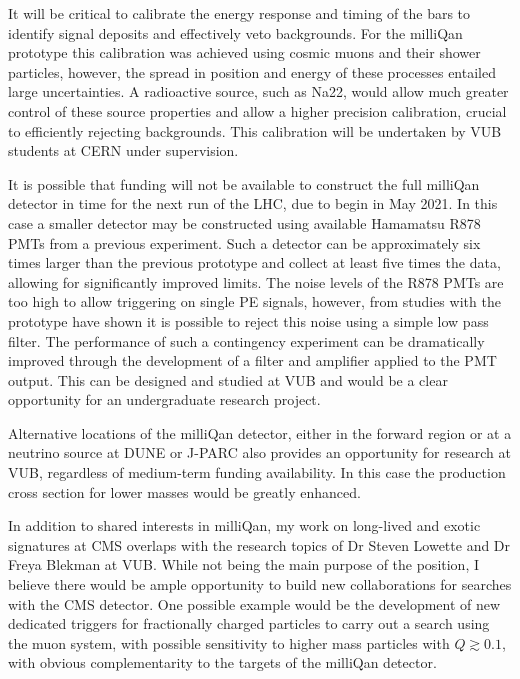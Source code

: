 \documentclass[11pt]{article}
\theoremstyle{plain} \numberwithin{equation}{section}
\theoremstyle{definition}
\begin{document}
It will be critical to calibrate the energy response and timing of the bars 
to identify signal deposits and effectively veto backgrounds. 
For the milliQan prototype this calibration was achieved using cosmic muons 
and their shower particles, however, the spread in position and energy of these processes
entailed large uncertainties. A radioactive source, such as Na22, would allow much greater control 
of these source properties and allow a higher precision calibration, crucial to efficiently 
rejecting backgrounds. This calibration will be undertaken by VUB students at CERN under supervision.


It is possible that funding will not be available to construct the full milliQan detector in
time for the next run of the LHC, due to begin in May 2021. In this case a smaller 
detector may be constructed using available Hamamatsu R878 PMTs from a previous experiment. 
Such a detector can be approximately six times
larger than the previous prototype and collect at least five times the data, allowing for
significantly improved limits. The noise levels of the R878 PMTs 
are too high to allow triggering on single PE signals, however, from studies with the prototype
have shown it is possible to reject this noise using a simple low pass filter. The performance of
such a contingency experiment can be dramatically improved through the development of a
filter and amplifier applied to the PMT output. This can be designed and studied at VUB and
would be a clear opportunity for an undergraduate research project.

Alternative locations of the milliQan detector, either in the forward region or at a neutrino source 
at DUNE or J-PARC also provides an opportunity for research at VUB, regardless of medium-term funding availability. 
In this case the production cross section for lower masses would be greatly enhanced.

In addition to shared interests in milliQan, my work on long-lived and exotic signatures
at CMS overlaps with the research topics of Dr Steven Lowette and Dr Freya Blekman at VUB. 
While not being the main purpose of the position, I believe there would be ample opportunity
to build new collaborations for searches with the CMS detector. One possible example
would be the development of new dedicated triggers for fractionally 
charged particles to carry out a search using the muon system, with possible 
sensitivity to higher mass particles with $Q \gtrsim 0.1$, with obvious complementarity 
to the targets of the milliQan detector.
\end{document}
